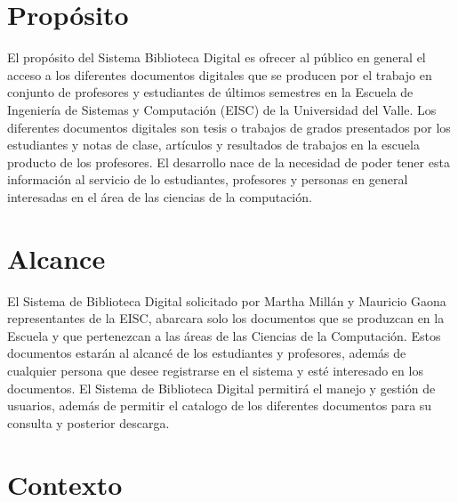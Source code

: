 \documentclass[11pt]{article}
\begin{document}
\newpage
\tableofcontents
\newpage
        
\section{Propósito}
El propósito del Sistema Biblioteca Digital es ofrecer al público en general el acceso a los
diferentes documentos digitales que se producen por el trabajo en conjunto de profesores y
estudiantes de últimos semestres en la Escuela de Ingeniería de Sistemas y Computación (EISC) de la
Universidad del Valle.
Los diferentes documentos digitales son tesis o trabajos de grados presentados por los estudiantes
y notas de clase, artículos y resultados de trabajos en la escuela producto de los profesores.
El desarrollo nace de la necesidad de poder tener esta información al servicio de lo estudiantes,
profesores y personas en general interesadas en el área de las ciencias de la computación.

\section{Alcance}
El Sistema de Biblioteca Digital solicitado por Martha Millán  y Mauricio Gaona representantes de
la EISC, abarcara solo los documentos que se produzcan en la Escuela y que pertenezcan a las áreas
de las Ciencias de la Computación. Estos documentos estarán al alcancé de los estudiantes y
profesores, además de cualquier persona que desee registrarse en el sistema y esté interesado en
los documentos. 
El Sistema de Biblioteca Digital permitirá el manejo  y gestión de usuarios, además de permitir el
catalogo de los diferentes documentos para su consulta y posterior descarga.

\section{Contexto}
\end{document}

